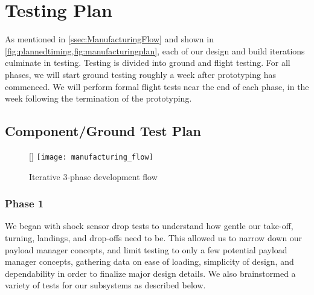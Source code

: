 
\section{Testing Plan} %
\label{sec:TestingPlan}

As mentioned in \cref{ssec:ManufacturingFlow} and shown in \cref{fig:plannedtiming,fig:manufacturingplan}, each of our design and build iterations culminate in testing.  Testing is divided into ground and flight testing. For all phases, we will start ground testing roughly a week after prototyping has commenced. We will perform formal flight tests near the end of each phase, in the week following the termination of the prototyping.


\subsection{Component/Ground Test Plan}
\label{ssec:GroundTestingPlan}
\begin{wrapfigure}[10]{R}{0pt}
	\centering
	\raisebox{0pt}[\dimexpr{}\baselineskip\relax]{ %
		\texttt{[image: manufacturing\_flow]}
	} %
	\caption{Iterative 3-phase development flow}
	\label{fig:manufacturingplan}
\end{wrapfigure}
\subsubsection{Phase 1} We began with shock sensor drop tests to understand how gentle our take-off, turning, landings, and drop-offs need to be. This allowed us to narrow down our payload manager concepts, and limit testing to only a few potential payload manager concepts, gathering data on ease of loading, simplicity of design, and dependability in order to finalize major design details.  We also brainstormed a variety of tests for our subsystems as described below.

